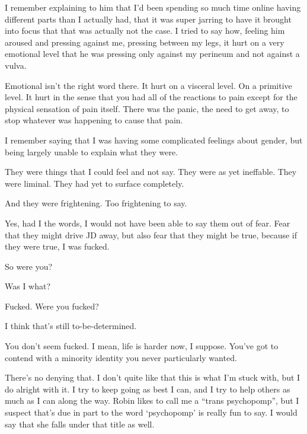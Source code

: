 I remember explaining to him that I'd been spending so much time online having different parts than I actually had, that it was super jarring to have it brought into focus that that was actually not the case. I tried to say how, feeling him aroused and pressing against me, pressing between my legs, it hurt on a very emotional level that he was pressing only against my perineum and not against a vulva.

\begin{ally}
Emotional isn't the right word there. It hurt on a visceral level. On a primitive level. It hurt in the sense that you had all of the reactions to pain except for the physical sensation of pain itself. There was the panic, the need to get away, to stop whatever was happening to cause that pain.
\end{ally}
I remember saying that I was having some complicated feelings about gender, but being largely unable to explain what they were.

They were things that I could feel and not say. They were as yet ineffable. They were liminal. They had yet to surface completely.

\begin{ally}
And they were frightening. Too frightening to say.
\end{ally}
Yes, had I the words, I would not have been able to say them out of fear. Fear that they might drive JD away, but also fear that they might be true, because if they were true, I was fucked.
\newpage

\begin{ally}
So were you?
\end{ally}
Was I what?

\begin{ally}
Fucked. Were you fucked?
\end{ally}
I think that's still to-be-determined.

\begin{ally}
You don't seem fucked. I mean, life is harder now, I suppose. You've got to contend with a minority identity you never particularly wanted.
\end{ally}
There's no denying that. I don't quite like that this is what I'm stuck with, but I do alright with it. I try to keep going as best I can, and I try to help others as much as I can along the way. Robin likes to call me a ``trans psychopomp'', but I suspect that's due in part to the word `psychopomp' is really fun to say. I would say that she falls under that title as well.

